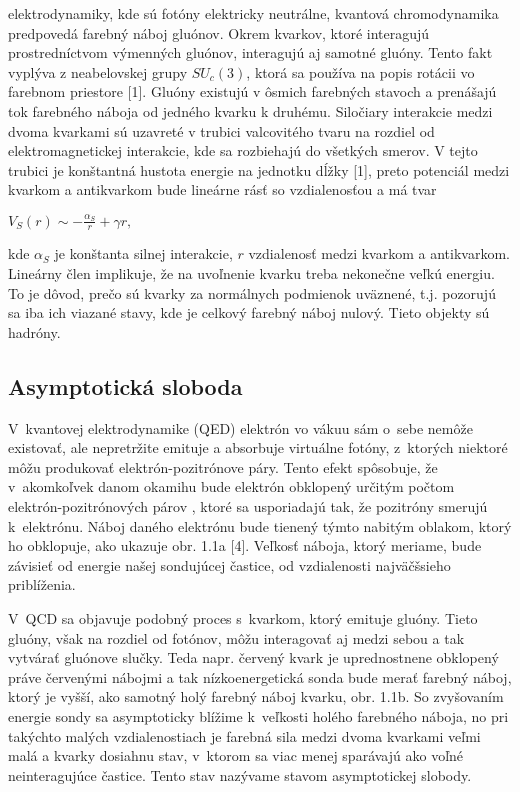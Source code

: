elektrodynamiky, kde sú fotóny elektricky neutrálne, kvantová
chromodynamika predpovedá farebný náboj gluónov. Okrem kvarkov, ktoré
interagujú prostredníctvom výmenných gluónov, interagujú aj samotné gluóny.
Tento fakt vyplýva z neabelovskej grupy $SU_c(3)$, ktorá sa používa na popis
rotácii vo farebnom priestore [1]. Gluóny existujú v ôsmich farebných
stavoch a prenášajú tok farebného náboja od jedného kvarku k druhému.
Siločiary interakcie medzi dvoma kvarkami sú
uzavreté v trubici valcovitého tvaru na rozdiel od elektromagnetickej
interakcie, kde sa rozbiehajú do všetkých smerov. V tejto trubici
je konštantná hustota energie na jednotku dĺžky [1], preto potenciál medzi
kvarkom a antikvarkom bude lineárne rásť so vzdialenosťou a má tvar
\begin{center}
  {\large $V_{S}(r) \sim -\frac{\alpha_{S}}{r} + \gamma r,$ }
\end{center}
kde $\alpha_{S}$ je konštanta silnej interakcie, $r$ vzdialenosť medzi
kvarkom a antikvarkom. Lineárny člen implikuje, že na uvoľnenie
kvarku treba nekonečne veľkú energiu. To je dôvod, prečo sú kvarky za
normálnych podmienok uväznené, t.j. pozorujú sa iba ich viazané stavy,
kde je celkový farebný náboj nulový. Tieto  objekty sú hadróny.


\subsection{Asymptotická sloboda}
V~kvantovej elektrodynamike (QED) elektrón vo vákuu sám o~sebe nemôže
existovať, ale nepretržite  emituje a absorbuje virtuálne
fotóny,  z~ktorých niektoré môžu produkovať elektrón-pozitrónove
páry. Tento efekt spôsobuje, že v~akomkoľvek danom okamihu bude
elektrón obklopený určitým  počtom elektrón-pozitrónových
párov , ktoré sa usporiadajú tak, že
pozi\-tróny smerujú  k~elektrónu. Náboj daného elektrónu bude
tienený týmto nabitým oblakom, ktorý ho obklopuje, ako ukazuje obr.
1.1a [4]. Veľkosť náboja, ktorý meriame, bude závisieť od
energie našej  sondujúcej častice, od vzdialenosti najväčšsieho
priblíženia.

V~QCD sa objavuje podobný proces
s~kvarkom, ktorý emituje gluóny. Tieto gluóny, však na rozdiel od
fotónov, môžu interagovať aj medzi sebou a tak vytvárať
gluónove slučky. Teda napr. červený kvark je uprednostnene
obklopený práve červenými nábojmi a tak nízkoenergetická sonda
bude merať farebný náboj, ktorý je vyšší, ako samotný
holý farebný náboj kvarku, obr. 1.1b. So zvyšovaním energie
sondy sa asymptoticky blížime  k~veľkosti holého farebného
náboja, no pri takýchto malých vzdialenostiach je farebná sila medzi
dvoma kvarkami veľmi malá a kvarky dosiahnu stav, v~ktorom sa viac
menej sparávajú ako voľné neinte\-ragujúce častice. Tento stav
nazývame stavom asymptotickej slobody.

